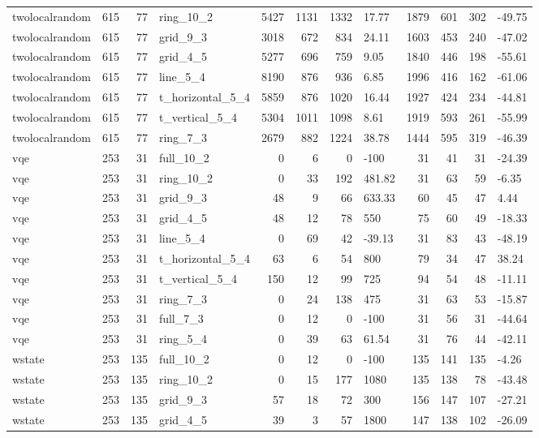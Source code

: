 \begin{longtable}{lrrlrrrlrrrl}
twolocalrandom & 615 & 77 & ring\_10\_2 & 5427 & 1131 & 1332 & 17.77 & 1879 & 601 & 302 & -49.75 \\
twolocalrandom & 615 & 77 & grid\_9\_3 & 3018 & 672 & 834 & 24.11 & 1603 & 453 & 240 & -47.02 \\
twolocalrandom & 615 & 77 & grid\_4\_5 & 5277 & 696 & 759 & 9.05 & 1840 & 446 & 198 & -55.61 \\
twolocalrandom & 615 & 77 & line\_5\_4 & 8190 & 876 & 936 & 6.85 & 1996 & 416 & 162 & -61.06 \\
twolocalrandom & 615 & 77 & t\_horizontal\_5\_4 & 5859 & 876 & 1020 & 16.44 & 1927 & 424 & 234 & -44.81 \\
twolocalrandom & 615 & 77 & t\_vertical\_5\_4 & 5304 & 1011 & 1098 & 8.61 & 1919 & 593 & 261 & -55.99 \\
twolocalrandom & 615 & 77 & ring\_7\_3 & 2679 & 882 & 1224 & 38.78 & 1444 & 595 & 319 & -46.39 \\
vqe & 253 & 31 & full\_10\_2 & 0 & 6 & 0 & -100 & 31 & 41 & 31 & -24.39 \\
vqe & 253 & 31 & ring\_10\_2 & 0 & 33 & 192 & 481.82 & 31 & 63 & 59 & -6.35 \\
vqe & 253 & 31 & grid\_9\_3 & 48 & 9 & 66 & 633.33 & 60 & 45 & 47 & 4.44 \\
vqe & 253 & 31 & grid\_4\_5 & 48 & 12 & 78 & 550 & 75 & 60 & 49 & -18.33 \\
vqe & 253 & 31 & line\_5\_4 & 0 & 69 & 42 & -39.13 & 31 & 83 & 43 & -48.19 \\
vqe & 253 & 31 & t\_horizontal\_5\_4 & 63 & 6 & 54 & 800 & 79 & 34 & 47 & 38.24 \\
vqe & 253 & 31 & t\_vertical\_5\_4 & 150 & 12 & 99 & 725 & 94 & 54 & 48 & -11.11 \\
vqe & 253 & 31 & ring\_7\_3 & 0 & 24 & 138 & 475 & 31 & 63 & 53 & -15.87 \\
vqe & 253 & 31 & full\_7\_3 & 0 & 12 & 0 & -100 & 31 & 56 & 31 & -44.64 \\
vqe & 253 & 31 & ring\_5\_4 & 0 & 39 & 63 & 61.54 & 31 & 76 & 44 & -42.11 \\
wstate & 253 & 135 & full\_10\_2 & 0 & 12 & 0 & -100 & 135 & 141 & 135 & -4.26 \\
wstate & 253 & 135 & ring\_10\_2 & 0 & 15 & 177 & 1080 & 135 & 138 & 78 & -43.48 \\
wstate & 253 & 135 & grid\_9\_3 & 57 & 18 & 72 & 300 & 156 & 147 & 107 & -27.21 \\
wstate & 253 & 135 & grid\_4\_5 & 39 & 3 & 57 & 1800 & 147 & 138 & 102 & -26.09 \\

\end{longtable}
